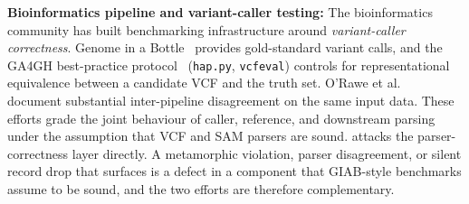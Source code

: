 \textbf{Bioinformatics pipeline and variant-caller testing:}
The bioinformatics community has built benchmarking infrastructure
around \emph{variant-caller correctness}. Genome in a
Bottle~\citep{zook2019giab} provides gold-standard variant calls,
and the GA4GH best-practice
protocol~\citep{krusche2019benchmarking} (\texttt{hap.py},
\texttt{vcfeval}) controls for representational equivalence
between a candidate VCF and the truth set. O'Rawe et
al.~\cite{orawe2013concordance} document substantial
inter-pipeline disagreement on the same input data. These efforts
grade the joint behaviour of caller, reference, and downstream
parsing under the assumption that VCF and SAM parsers are sound.
\biotest{} attacks the parser-correctness layer directly. A
metamorphic violation, parser disagreement, or silent record drop
that \biotest{} surfaces is a defect in a component that
GIAB-style benchmarks assume to be sound, and the two efforts are
therefore complementary.
